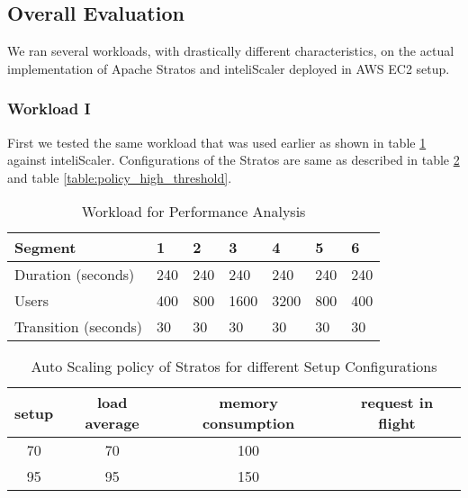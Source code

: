 \subsection{Overall Evaluation}

We ran several workloads, with drastically different characteristics, on the actual implementation of Apache Stratos and inteliScaler deployed in AWS EC2 setup.

\subsubsection{Workload I}
First we tested the same workload that was used earlier as shown in table \ref{table:analysis_workload} against inteliScaler. Configurations of the Stratos are same as described in table \ref{table:policy_low_threshold} and table \ref{table:policy_high_threshold}.

\begin{table}[h!]
\centering
\caption{Workload for Performance Analysis}
\label{table:analysis_workload}
\begin{tabular}{|l|l|l|l|l|l|l|}
\hline
Segment & 1 & 2 & 3 & 4 & 5 & 6\\ \hline
Duration (seconds) & 240 & 240 & 240 & 240 & 240 & 240 \\ \hline
Users & 400 & 800 & 1600 & 3200 & 800 & 400   \\ \hline
Transition (seconds) & 30 & 30 & 30 & 30 & 30 & 30 \\ \hline
\end{tabular}
\end{table}

\begin{table}[h!]
\centering
\caption{Auto Scaling policy of Stratos for different Setup Configurations}
\label{table:policy_low_threshold}
\begin{tabular}{|c|c|c|c|}
\hline
setup & load average & memory consumption & request in flight \\ \hline
70 & 70 & 100\\ \hline
95 & 95 & 150\\ \hline
\end{tabular}
\end{table}
